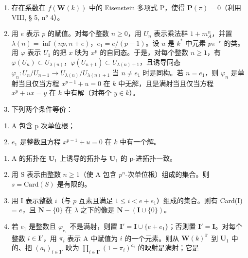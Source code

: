 \begin{enumerate}
\def\labelenumi{\alph{enumi})}
\item
  存在系数在 \(f(\mathbf{W}(k))\) 中的 Eisenstein 多项式 P，使得 \(\mathbf{P}(\pi)=0\)（利用 VIII, § 5, n° 4）。
\item
  用 \(e\) 表示 \(p\) 的赋值。对每个整数 \(n \geqslant 0\)，用 \(U_n\) 表示乘法群 \(1 + m_A^n\)，并置 \(\lambda(n) = \inf(np, n + e)\)，\(e_1 = e/(p - 1)\)。设 \(u\) 是 \(k^*\) 中元素 \(p\pi^{-e}\) 的类。用 \(\varphi\) 表示 \(U_1\) 的把 \(x\) 映为 \(x^p\) 的自同态。于是，对每个整数 \(n \geqslant 1\)，有 \(\varphi(U_n) \subset U_{\lambda(n)}\)，\(\varphi(U_{n+1}) \subset U_{\lambda(n)+1}\)，且诱导同态 \(\varphi_n: U_n/U_{n+1} \to U_{\lambda(n)}/U_{\lambda(n)+1}\) 当 \(n \neq e_1\) 时是同构。若 \(n = e_1\)，则 \(\varphi_n\) 是单射当且仅当方程 \(x^{p-1} + u = 0\) 在 \(k\) 中无解，且是满射当且仅当方程 \(x^p + ux = y\) 在 \(k\) 中有解（对每个 \(y \in k\)）。
\item
  下列两个条件等价：
\end{enumerate}

\begin{enumerate}
\def\labelenumi{(\roman{enumi})}
\item
  A 包含 p 次单位根；
\item
  \(e_1\) 是整数且方程 \(x^{p - 1} + u = 0\) 在 \(k\) 中有一个解。
\end{enumerate}

\begin{enumerate}
\def\labelenumi{\alph{enumi})}
\setcounter{enumi}{3}
\item
  A 的拓扑在 \(\mathbf{U}_1\) 上诱导的拓扑与 \(\mathbf{U}_1\) 的 p-进拓扑一致。
\item
  用 S 表示由整数 \(n \geqslant 1\)（使 A 包含 \(p^n\)-次单位根）组成的集合。则 \(s = \text{Card}(S)\) 是有限的。
\item
  用 I 表示整数 \(i\)（与 \(p\) 互素且满足 \(1 \leqslant i < e + e_1\)）组成的集合。则有 Card(I) = \(e\)，且 \(\mathbf{N} - \{0\}\) 在 \(\lambda\) 之下的像是 \(\mathbf{N} - (\mathbf{I} \cup \{0\})\)。
\item
  若 \(e_1\) 是整数且 \(\varphi_{e_1}\) 不是满射，则置 \(\mathbf{I}' = \mathbf{I} \cup \{e + e_1\}\)；否则置 \(\mathbf{I}' = \mathbf{I}\)。对每个整数 \(i \in \mathbf{I}'\)，用 \(\pi_i\) 表示 A 中赋值为 \(i\) 的一个元素。则从 \(\mathbf{W}(k)^{\mathbf{I}'}\) 到 \(\mathbf{U}_1\) 中的、把 \((a_i)_{i \in \mathbf{I}'}\) 映为 \(\prod_{i \in \mathbf{I}'} (1 + \pi_i)^{a_i}\) 的映射是满射；它是
\end{enumerate}

